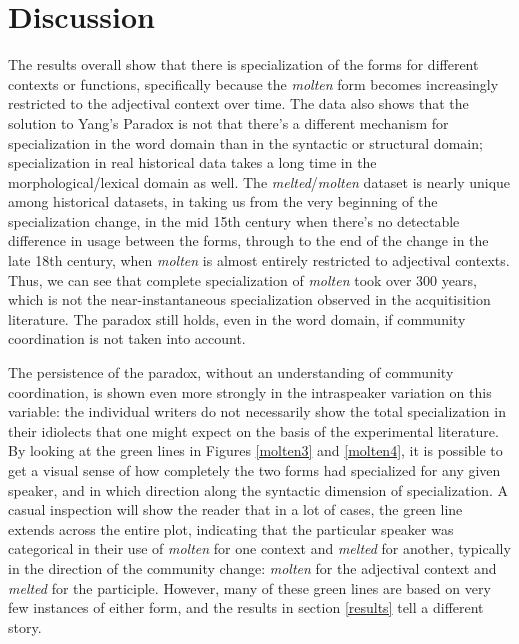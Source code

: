 \documentclass{artikel3}
\begin{document}
\section{Discussion}
\label{discuss}

The results overall show that there is specialization of the forms for different contexts or functions, specifically because the \textsl{molten} form becomes increasingly restricted to the adjectival context over time. The data also shows that the solution to Yang's Paradox is not that there's a different mechanism for specialization in the word domain than in the syntactic or structural domain; specialization in real historical data takes a long time in the morphological/lexical domain as well. The \textsl{melted}/\textsl{molten} dataset is nearly unique among historical datasets, in taking us from the very beginning of the specialization change, in the mid 15th century when there's no detectable difference in usage between the forms, through to the end of the change in the late 18th century, when \textsl{molten} is almost entirely restricted to adjectival contexts. Thus, we can see that complete specialization of \textsl{molten} took over 300 years, which is not the near-instantaneous specialization observed in the acquitisition literature. The paradox still holds, even in the word domain, if community coordination is not taken into account.

The persistence of the paradox, without an understanding of community coordination, is shown even more strongly in the intraspeaker variation on this variable: the individual writers do not necessarily show the total specialization in their idiolects that one might expect on the basis of the experimental literature. By looking at the green lines in Figures \ref{molten3} and \ref{molten4}, it is possible to get a visual sense of how completely the two forms had specialized for any given speaker, and in which direction along the syntactic dimension of specialization. A casual inspection will show the reader that in a lot of cases, the green line extends across the entire plot, indicating that the particular speaker was categorical in their use of \textsl{molten} for one context and \textsl{melted} for another, typically in the direction of the community change: \textsl{molten} for the  adjectival context and \textsl{melted} for the participle. However, many of these green lines are based on very few instances of either form, and the results in section \ref{results} tell a different story. 
\end{document}
